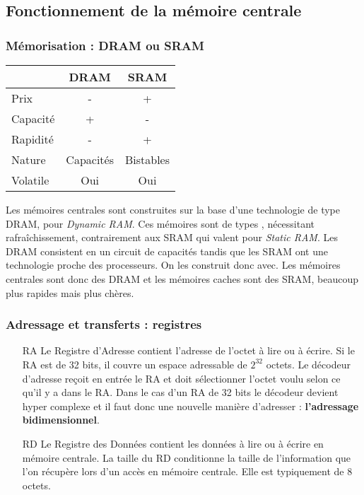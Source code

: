 \documentclass[12pt,a4paper]{report}
\begin{document}
\subsection{Fonctionnement de la mémoire centrale}
\subsubsection{Mémorisation : DRAM ou SRAM}
\begin{wraptable}[7]{r}{0.4\textwidth}
\vspace{-0.5cm}
\centering
\begin{tabular}{|l|cc |}
\hline 
 & DRAM & SRAM \\
 \hline
Prix & - & + \\
Capacité & + & - \\
Rapidité & - & + \\
Nature & Capacités & Bistables \\
Volatile & Oui & Oui \\
\hline
\end{tabular}
\end{wraptable}
Les mémoires centrales sont construites sur la base d'une technologie de type DRAM, pour \textit{Dynamic RAM}. Ces mémoires sont de types , nécessitant rafraîchissement, contrairement aux SRAM qui valent pour \textit{Static RAM}. Les DRAM consistent en un circuit de capacités tandis que les SRAM ont une technologie proche des processeurs. On les construit donc avec. Les mémoires centrales sont donc des DRAM et les mémoires caches sont des SRAM, beaucoup plus rapides mais plus chères.
\subsubsection{Adressage et transferts : registres}
\begin{itemize}
\item[RA] Le Registre d'Adresse contient l'adresse de l'octet à lire ou à écrire. Si le RA est de 32 bits, il couvre un espace adressable de $2^{32}$ octets. Le décodeur d'adresse reçoit en entrée le RA et doit sélectionner l'octet voulu selon ce qu'il y a dans le RA. Dans le cas d'un RA de 32 bits le décodeur devient hyper complexe et il faut donc une nouvelle manière d'adresser : \textbf{l'adressage bidimensionnel}.
\item[RD] Le Registre des Données contient les données à lire ou à écrire en mémoire centrale. La taille du RD conditionne la taille de l'information que l'on récupère lors d'un accès en mémoire centrale. Elle est typiquement de 8 octets.
\end{itemize}
\end{document}

